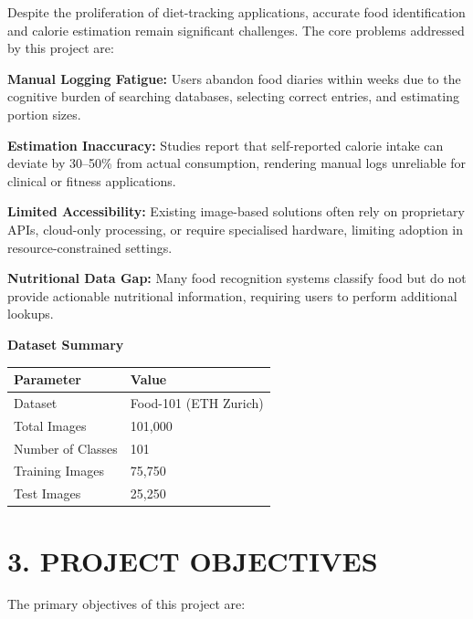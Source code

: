 \documentclass[12pt,a4paper]{article}
\begin{document}
Despite the proliferation of diet-tracking applications, accurate food identification and calorie estimation remain significant challenges. The core problems addressed by this project are:

\textbf{Manual Logging Fatigue:} Users abandon food diaries within weeks due to the cognitive burden of searching databases, selecting correct entries, and estimating portion sizes.

\textbf{Estimation Inaccuracy:} Studies report that self-reported calorie intake can deviate by 30--50\% from actual consumption, rendering manual logs unreliable for clinical or fitness applications.

\textbf{Limited Accessibility:} Existing image-based solutions often rely on proprietary APIs, cloud-only processing, or require specialised hardware, limiting adoption in resource-constrained settings.

\textbf{Nutritional Data Gap:} Many food recognition systems classify food but do not provide actionable nutritional information, requiring users to perform additional lookups.

\vspace{0.5cm}
\textbf{Dataset Summary}
\vspace{0.3cm}

\begin{tabularx}{\textwidth}{lX}
\toprule
\textbf{Parameter} & \textbf{Value} \\
\midrule
Dataset & Food-101 (ETH Zurich) \\
Total Images & 101,000 \\
Number of Classes & 101 \\
Training Images & 75,750 \\
Test Images & 25,250 \\
\bottomrule
\end{tabularx}


\newpage
\section{3. PROJECT OBJECTIVES}

The primary objectives of this project are:
\end{document}
